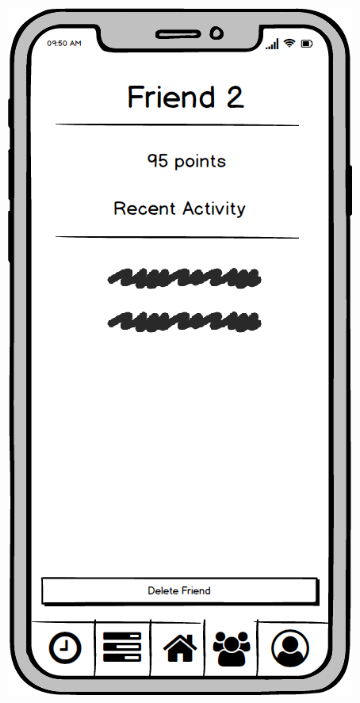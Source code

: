 \begin{figure}
\begin{subfigure}[b]{0.3\textwidth}
        \label{fig:friends}
    \end{subfigure}
    \hfill
    \begin{subfigure}[b]{0.3\textwidth}
        \centering
        \includegraphics[width=\textwidth]{./graphics/design/Friends (Recent Activity).png}

\end{subfigure}
\end{figure}
